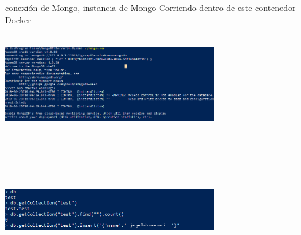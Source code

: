 \documentclass[twoside,onecolumn]{article}
\begin{document}
\begin{flushright}
\begin{itemize}
conexión de Mongo, instancia de Mongo Corriendo
dentro de este contenedor Docker
\textbf{}\\
\textbf{}\\
\begin{center}
		\includegraphics[width=9cm]{./Imagenes/12d}
		\end{center}	
\textbf{}\\
\textbf{}\\
\textbf{}\\
\textbf{}\\
\begin{center}
		\includegraphics[width=9cm]{./Imagenes/13d}
		\end{center}	
\textbf{}\\
\textbf{}\\


\end{itemize}
\end{flushright}
\end{document}
